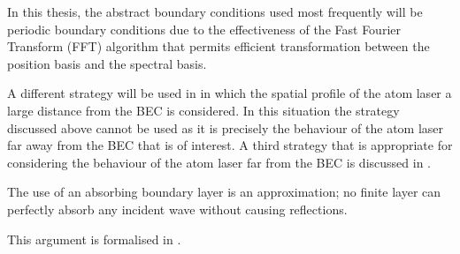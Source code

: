 In this thesis, the abstract boundary conditions used most frequently will be periodic boundary conditions due to the effectiveness of the Fast Fourier Transform (FFT) algorithm that permits efficient transformation between the position basis and the spectral basis.



A different strategy will be used in  in which the spatial profile of the atom laser a large distance from the BEC is considered. In this situation the strategy discussed above cannot be used as it is precisely the behaviour of the atom laser far away from the BEC that is of interest. A third strategy that is appropriate for considering the behaviour of the atom laser far from the BEC is discussed in .



The use of an absorbing boundary layer is an approximation; no finite layer can perfectly absorb any incident wave without causing reflections.

This argument is formalised in \citep{Neuhasuer:1989}.